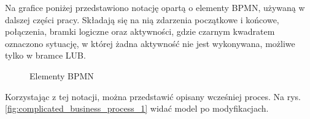 Na grafice poniżej przedstawiono notację opartą o elementy BPMN, używaną w dalszej części pracy. Składają się na nią zdarzenia początkowe i końcowe, połączenia, bramki logiczne oraz aktywności, gdzie czarnym kwadratem oznaczono sytuację, w której żadna aktywność nie jest wykonywana, możliwe tylko w bramce LUB. 
\clearpage
\begin{figure}[h]
	\caption{\label{fig:bpmn_example}Elementy BPMN}
	\label{fig:lifecycle}
\end{figure}

Korzystając z tej notacji, można przedstawić opisany wcześniej proces. Na rys.  \ref{fig:complicated_business_process_1} widać model po modyfikacjach. 


